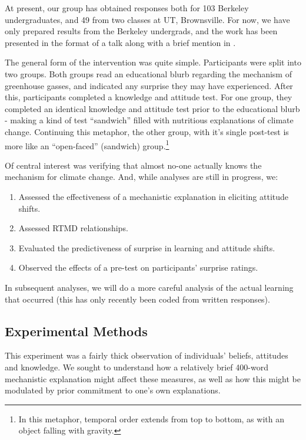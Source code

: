 At present, our group has obtained responses both for 103 Berkeley
undergraduates, and 49 from two classes at UT, Brownsville. For now, we have
only prepared results from the Berkeley undergrads, and the work has been
presented in the format of a talk along with a brief mention in
\citeauthor{ranney_why_inpress}.  

The general form of the intervention was quite simple. Participants were split
into two groups. Both groups read an educational blurb regarding the mechanism
of greenhouse gasses, and indicated any surprise they may have experienced.
After this, participants completed a knowledge and attitude test. For one group,
they completed an identical knowledge and attitude test prior to the educational
blurb - making a kind of test ``sandwich'' filled with nutritious explanations
of climate change. Continuing this metaphor, the other group, with it's single
post-test is more like an ``open-faced'' (sandwich) group.\footnote{In this
metaphor, temporal order extends from top to bottom, as with an object falling
with gravity.}

Of central interest was verifying that almost no-one actually knows the
mechanism for climate change. And, while analyses are still in progress, we:

\begin{enumerate}
    \item Assessed the effectiveness of a mechanistic explanation in eliciting
        attitude shifts.
    \item Assessed RTMD relationships.
    \item Evaluated the predictiveness of surprise in learning and attitude shifts.
    \item Observed the effects of a pre-test on participants' surprise ratings.
\end{enumerate}

In subsequent analyses, we will do a more careful analysis of the actual
learning that occurred (this has only recently been coded from written responses).


\subsection{Experimental Methods}

This experiment was a fairly thick observation of individuals' beliefs,
attitudes and knowledge. We sought to understand how a relatively brief 400-word
mechanistic explanation might affect these measures, as well as how this might
be modulated by prior commitment to one's own explanations.

